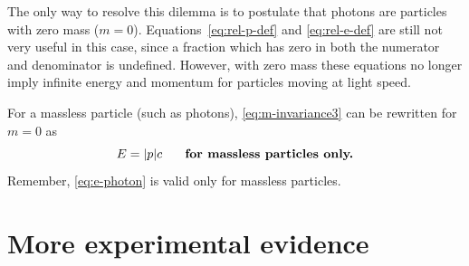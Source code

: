     
The only way to resolve this dilemma is to postulate that photons are
particles with zero mass ($m = 0$).  Equations~\eqref{eq:rel-p-def}
and \eqref{eq:rel-e-def} are still not very useful in this case, since a
fraction which has zero in both the numerator and denominator is
undefined.  However, with zero mass these equations no longer imply 
infinite energy and momentum for particles moving at light speed.
    
For a massless particle (such as photons),
\eqref{eq:m-invariance3} can be rewritten for $m=0$ as
\begin{equation}
E = \vert p\vert c\text{\hspace{0.25in}\textbf{for massless particles only.}}
\label{eq:e-photon}
\end{equation}
Remember, \eqref{eq:e-photon} is valid only for massless
particles.

\section{More experimental evidence}

